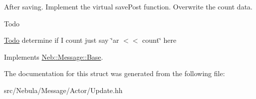 \-After saving. \-Implement the virtual save\-Post function. \-Overwrite the count data. 

\begin{DoxyRefDesc}{\-Todo}
\item[\hyperlink{todo__todo000016}{\-Todo}]determine if \-I count just say \char`\"{}ar $<$$<$ count\char`\"{} here \end{DoxyRefDesc}


\-Implements \hyperlink{classNeb_1_1Message_1_1Base}{\-Neb\-::\-Message\-::\-Base}.



\-The documentation for this struct was generated from the following file\-:\begin{DoxyCompactItemize}
\item 
src/\-Nebula/\-Message/\-Actor/\-Update.\-hh\end{DoxyCompactItemize}
